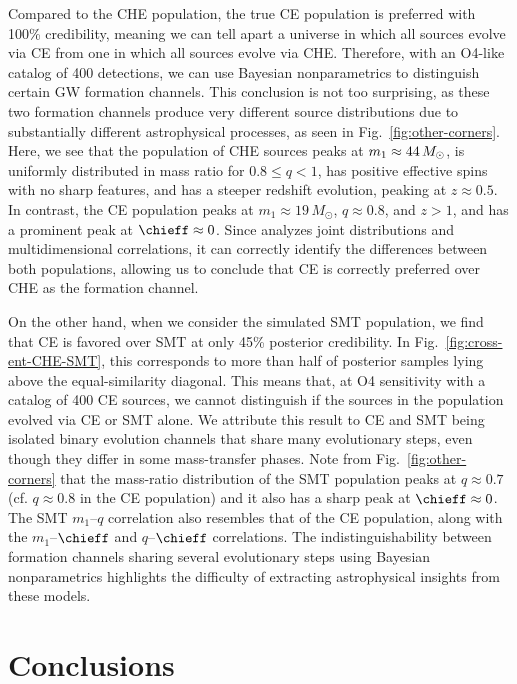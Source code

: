 \begin{refsection}
Compared to the CHE population, the true CE population is preferred with 100\% credibility, meaning we can tell apart a universe in which all sources evolve via CE from one in which all sources evolve via CHE. Therefore, with an O4-like catalog of 400 detections, we can use Bayesian nonparametrics to distinguish certain GW formation channels. This conclusion is not too surprising, as these two formation channels produce very different source distributions due to substantially different astrophysical processes, as seen in Fig.~\ref{fig:other-corners}. Here, we see that the population of \ac{CHE} sources peaks at $m_1 \approx 44\,M_\odot$, is uniformly distributed in mass ratio for $0.8 \leq q < 1$, has positive effective spins with no sharp features, and has a steeper redshift evolution, peaking at $z\approx0.5$. In contrast, the \ac{CE} population peaks at $m_1\approx19\,M_\odot$, $q\approx0.8$, and $z>1$, and has a prominent peak at $\chieff\approx0$. Since \PixelPop analyzes joint distributions and multidimensional correlations, it can correctly identify the differences between both populations, allowing us to conclude that \ac{CE} is correctly preferred over \ac{CHE} as the formation channel.

On the other hand, when we consider the simulated \ac{SMT} population, we find that \ac{CE} is favored over \ac{SMT} at only 45\% posterior credibility. In Fig.~\ref{fig:cross-ent-CHE-SMT}, this corresponds to more than half of posterior samples lying above the equal-similarity diagonal. This means that, at O4 sensitivity with a catalog of 400 \ac{CE} sources, we cannot distinguish if the sources in the population evolved via \ac{CE} or \ac{SMT} alone. We attribute this result to \ac{CE} and \ac{SMT} being isolated binary evolution channels that share many evolutionary steps, even though they differ in some mass-transfer phases. Note from Fig.~\ref{fig:other-corners} that the mass-ratio distribution of the \ac{SMT} population peaks at $q\approx0.7$ (cf. $q\approx0.8$ in the \ac{CE} population) and it also has a sharp peak at $\chieff\approx0$. The SMT $m_1$--$q$ correlation also resembles that of the \ac{CE} population, along with the $m_1$--$\chieff$ and $q$--$\chieff$ correlations. The indistinguishability between formation channels sharing several evolutionary steps using Bayesian nonparametrics highlights the difficulty of extracting astrophysical insights from these models.

\section{Conclusions}
\label{sec: nlth conclusions}


\end{refsection}
